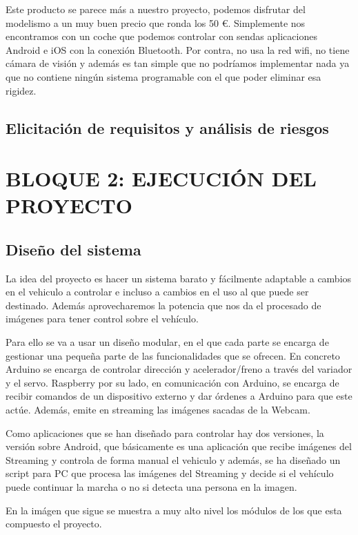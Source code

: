 \documentclass{pclass}
\begin{document}
Este producto se parece más a nuestro proyecto, podemos disfrutar del modelismo a un muy buen precio que ronda los 50 \euro. Simplemente nos encontramos con un coche que podemos controlar con sendas aplicaciones Android e iOS con la conexión Bluetooth. Por contra, no usa la red wifi, no tiene cámara de visión y además es tan simple que no podríamos implementar nada ya que no contiene ningún sistema programable con el que poder eliminar esa rigidez.



\section{Elicitación de requisitos y análisis de riesgos}
\chapter{BLOQUE 2: EJECUCIÓN DEL PROYECTO}
\section{Diseño del sistema}

La idea del proyecto es hacer un sistema barato y fácilmente adaptable a cambios en el vehiculo a controlar e incluso a cambios en el uso al que puede ser destinado. Además aprovecharemos la potencia que nos da el procesado de imágenes para tener control sobre el vehículo.

Para ello se va a usar un diseño modular, en el que cada parte se encarga de gestionar una pequeña parte de las funcionalidades que se ofrecen. En concreto Arduino se encarga de controlar dirección y acelerador/freno a través del variador y el servo. Raspberry por su lado, en comunicación con Arduino, se encarga de recibir comandos de un dispositivo externo y dar órdenes a Arduino para que este actúe. Además, emite en streaming las imágenes sacadas de la Webcam. 

Como aplicaciones que se han diseñado para controlar hay dos versiones, la versión sobre Android, que básicamente es una aplicación que recibe imágenes del Streaming y controla de forma manual el vehiculo y además, se ha diseñado un script para PC que procesa las imágenes del Streaming y decide si el vehículo puede continuar la marcha o no si detecta una persona en la imagen.

En la imágen que sigue se muestra a muy alto nivel los módulos de los que esta compuesto el proyecto.
\end{document}
